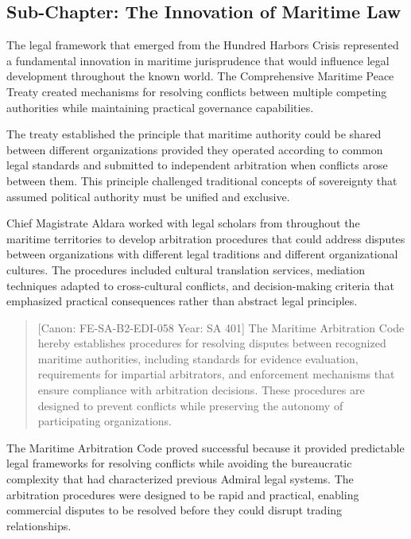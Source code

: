 \subsection{Sub-Chapter: The Innovation of Maritime
Law}\label{sub-chapter-the-innovation-of-maritime-law}

The legal framework that emerged from the Hundred Harbors Crisis
represented a fundamental innovation in maritime jurisprudence that
would influence legal development throughout the known world. The
Comprehensive Maritime Peace Treaty created mechanisms for resolving
conflicts between multiple competing authorities while maintaining
practical governance capabilities.

The treaty established the principle that maritime authority could be
shared between different organizations provided they operated according
to common legal standards and submitted to independent arbitration when
conflicts arose between them. This principle challenged traditional
concepts of sovereignty that assumed political authority must be unified
and exclusive.

Chief Magistrate Aldara worked with legal scholars from throughout the
maritime territories to develop arbitration procedures that could
address disputes between organizations with different legal traditions
and different organizational cultures. The procedures included cultural
translation services, mediation techniques adapted to cross-cultural
conflicts, and decision-making criteria that emphasized practical
consequences rather than abstract legal principles.

\begin{quote}
{[}Canon: FE-SA-B2-EDI-058 \textbar{} Year: SA 401{]} The Maritime
Arbitration Code hereby establishes procedures for resolving disputes
between recognized maritime authorities, including standards for
evidence evaluation, requirements for impartial arbitrators, and
enforcement mechanisms that ensure compliance with arbitration
decisions. These procedures are designed to prevent conflicts while
preserving the autonomy of participating organizations.
\end{quote}

The Maritime Arbitration Code proved successful because it provided
predictable legal frameworks for resolving conflicts while avoiding the
bureaucratic complexity that had characterized previous Admiral legal
systems. The arbitration procedures were designed to be rapid and
practical, enabling commercial disputes to be resolved before they could
disrupt trading relationships.

